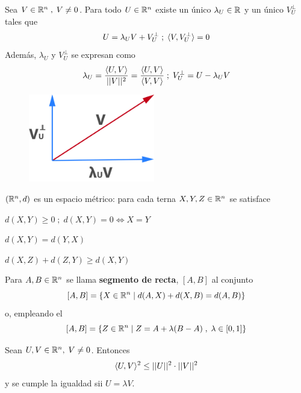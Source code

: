   Sea $V \in \mathbb{R}^n\;, \;V \neq 0$. Para todo $U \in \mathbb{R}^n$ existe un único $\lambda_U \in \mathbb{R}$ y un único $V_{U}^\perp$ tales que
$$U = \lambda_UV + V_{U}^\perp\;;\; \langle V, V_{U}^\perp \rangle = 0$$
Además, $\lambda_U$ y $V_U^\perp$ se expresan como
$$\lambda_U= \frac{\langle U,V \rangle}{||V||^2} = \frac{\langle U,V \rangle}{\langle V,V \rangle}\;;\; V_U^\perp = U - \lambda_UV$$
\begin{figure}[H]
	\centering
	\includegraphics[width=5.5cm]{figuras/13-13.jpg}
	\vspace{-1em}
\end{figure}
 $(\mathbb{R}^n,d)$ es un espacio métrico: para cada terna $X,Y,Z\in\mathbb{R}^n$ se satisface
\begin{itemizex}
	\item $d(X,Y) \ge 0\;;\; d(X,Y) = 0 \iff X=Y$
	\item $d(X,Y) = d(Y,X)$
	\item $d(X,Z) + d(Z,Y) \ge d(X,Y)$
\end{itemizex}
 Para $A,B \in \mathbb{R}^n$ se llama \textbf{segmento de recta}, $[A,B]$ al conjunto
$$[A,B] = \{X \in \mathbb{R}^n \;|\; d(A,X) + d(X,B) = d(A,B) \}$$
o, empleando el 
$$[A,B] = \{Z \in \mathbb{R}^n\;|\; Z = A + \lambda(B-A)\;,\; \lambda\in [0,1]\}$$

 Sean $U,V \in \mathbb{R}^n,\; V\neq 0$. Entonces
$$\langle U,V \rangle^2 \le ||U||^2\cdot||V||^2$$
y se cumple la igualdad sii $U = \lambda V$.

